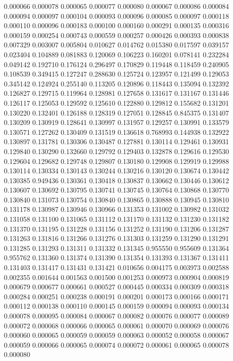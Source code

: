 0.000066
0.000078
0.000065
0.000077
0.000080
0.000067
0.000086
0.000084
0.000094
0.000097
0.000104
0.000093
0.000096
0.000085
0.000097
0.000118
0.000110
0.000096
0.000183
0.000100
0.000160
0.000291
0.000135
0.000316
0.000159
0.000254
0.000743
0.000559
0.000257
0.000426
0.000393
0.000838
0.007329
0.003007
0.005804
0.010627
0.014762
0.015380
0.017597
0.039157
0.023404
0.104889
0.081883
0.120069
0.106223
0.160201
0.078141
0.232284
0.049142
0.192710
0.176124
0.296497
0.170829
0.119448
0.118459
0.240905
0.108539
0.349415
0.127247
0.288630
0.125724
0.123957
0.121499
0.129053
0.345142
0.124924
0.255140
0.113205
0.120896
0.118443
0.135094
0.132392
0.126827
0.129715
0.119964
0.128981
0.127658
0.131617
0.131167
0.131446
0.126117
0.125053
0.129592
0.125610
0.122880
0.129812
0.155682
0.131201
0.130220
0.132401
0.126188
0.128319
0.127051
0.128845
0.845375
0.131407
0.130209
0.130919
0.128641
0.130997
0.131957
0.129257
0.130991
0.133579
0.130571
0.127262
0.130409
0.131519
0.136618
0.768993
0.144938
0.132922
0.130897
0.131781
0.130306
0.130487
0.127881
0.130114
0.129461
0.130931
0.129840
0.130290
0.132660
0.129792
0.129403
0.132878
0.129616
0.129530
0.129604
0.129682
0.129748
0.129807
0.130180
0.129908
0.129919
0.129988
0.130114
0.130334
0.130143
0.130244
0.130216
0.130120
0.130674
0.130442
0.130385
0.949436
0.130361
0.130418
0.130837
0.130662
0.130446
0.130612
0.130607
0.130692
0.130795
0.130741
0.130745
0.130764
0.130868
0.130770
0.130840
0.131073
0.130754
0.130840
0.130865
0.130888
0.130945
0.130810
0.131178
0.130987
0.130946
0.130966
0.131353
0.131002
0.130982
0.131032
0.131058
0.131100
0.131065
0.131112
0.131170
0.131132
0.131230
0.131182
0.131370
0.131195
0.131228
0.131156
0.131252
0.131190
0.131206
0.131287
0.131263
0.131816
0.131266
0.131276
0.131303
0.131259
0.131290
0.131291
0.131285
0.131293
0.131311
0.131332
0.131345
0.955550
0.955609
0.131364
0.955762
0.131360
0.131374
0.131390
0.131354
0.131393
0.131367
0.131411
0.131403
0.131417
0.131431
0.131421
0.010656
0.004175
0.003973
0.002588
0.002355
0.001644
0.001563
0.001500
0.001253
0.000973
0.000904
0.000819
0.000679
0.000677
0.000661
0.000527
0.000445
0.000334
0.000309
0.000318
0.000284
0.000251
0.000238
0.000191
0.000201
0.000173
0.000166
0.000171
0.000112
0.000138
0.000110
0.000145
0.000159
0.000094
0.000093
0.000134
0.000078
0.000095
0.000084
0.000067
0.000082
0.000076
0.000077
0.000089
0.000072
0.000068
0.000066
0.000065
0.000061
0.000070
0.000069
0.000076
0.000060
0.000065
0.000059
0.000059
0.000063
0.000052
0.000058
0.000067
0.000059
0.000066
0.000065
0.000074
0.000072
0.000061
0.000065
0.000078
0.000080

